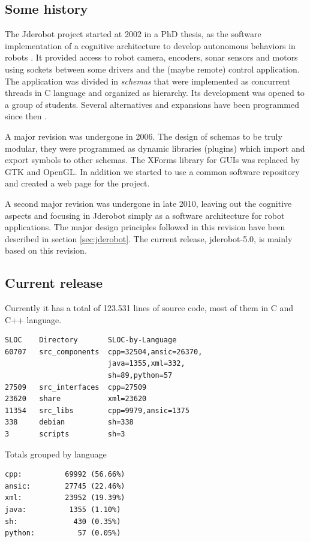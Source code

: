 \documentclass[twocolumn]{svjour3}          %
\begin{document}
\subsection{Some history}

The Jderobot project started at 2002 in a PhD thesis, as the software implementation of a cognitive architecture to develop autonomous behaviors in robots \cite{canas02,canas05e}. It provided access to robot camera, encoders, sonar sensors and motors using sockets between some drivers and the (maybe remote) control application. The application was divided in \textit{schemas} that were implemented as concurrent threads in C language and organized as hierarchy. Its development was opened to a group of students. Several alternatives and expansions have been programmed since then \cite{canas07,canas07f}. 

A major revision was undergone in 2006. The design of schemas to be truly modular, they were programmed as dynamic libraries (plugins) which import and export symbols to other schemas. The XForms library for GUIs was replaced by GTK and OpenGL. In addition we started to use a common software repository and created a web page for the project. 

A second major revision was undergone in late 2010, leaving out the cognitive aspects and focusing in Jderobot simply as a software architecture for robot applications. The major design principles followed in this revision have been described in section \ref{sec:jderobot}. The current release, jderobot-5.0, is mainly based on this revision.

\subsection{Current release}
Currently it has a total of 123.531 lines of source code, most of them in C and C++ language.

\begin{verbatim}
SLOC    Directory       SLOC-by-Language 
60707   src_components  cpp=32504,ansic=26370,
                        java=1355,xml=332,
                        sh=89,python=57
27509   src_interfaces  cpp=27509
23620   share           xml=23620
11354   src_libs        cpp=9979,ansic=1375
338     debian          sh=338
3       scripts         sh=3
\end{verbatim}

Totals grouped by language
\begin{verbatim}
cpp:          69992 (56.66%)
ansic:        27745 (22.46%)
xml:          23952 (19.39%)
java:          1355 (1.10%)
sh:             430 (0.35%)
python:          57 (0.05%)
\end{verbatim}
\end{document}
